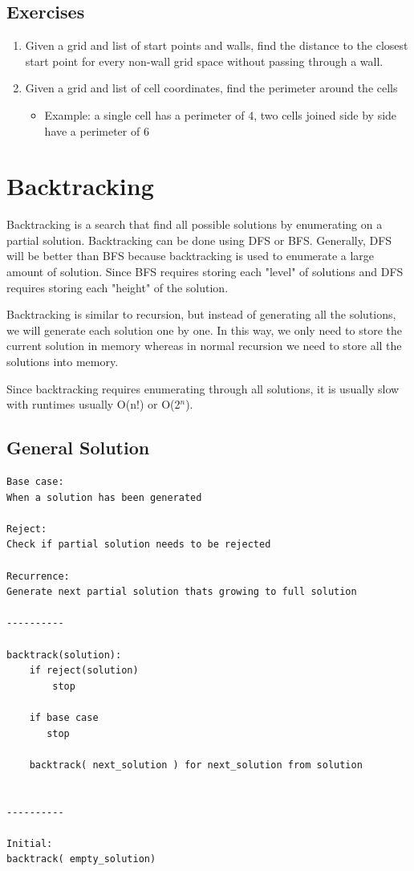 \documentclass[11pt,oneside]{book}
\begin{document}
\subsection{Exercises}

\begin{enumerate}
\item Given a grid and list of start points and walls, find the distance to the closest start point for every non-wall grid space without passing through a wall.
\item Given a grid and list of cell coordinates, find the perimeter around the cells

\begin{itemize}
\item Example: a single cell has a perimeter of 4, two cells joined side by side have a perimeter of 6
\end{itemize}
\end{enumerate}

        \section{ Backtracking }
        

Backtracking is a search that find all possible solutions by enumerating on a partial solution. Backtracking can be done using DFS or BFS. Generally, DFS will be better than BFS because backtracking is used to enumerate a large amount of solution. Since BFS requires storing each "level" of solutions and DFS requires storing each "height" of the solution.

Backtracking is similar to recursion, but instead of generating all the solutions, we will generate each solution one by one. In this way, we only need to store the current solution in memory whereas in normal recursion we need to store all the solutions into memory.

Since backtracking requires enumerating through all solutions, it is usually slow with runtimes usually O(n!) or O(2$^{n}$).

\subsection{General Solution}

\begin{lstlisting}
Base case:
When a solution has been generated

Reject:
Check if partial solution needs to be rejected

Recurrence:
Generate next partial solution thats growing to full solution

----------

backtrack(solution):
    if reject(solution)
        stop

    if base case
       stop

    backtrack( next_solution ) for next_solution from solution


----------

Initial:
backtrack( empty_solution)

\end{lstlisting}
\end{document}
